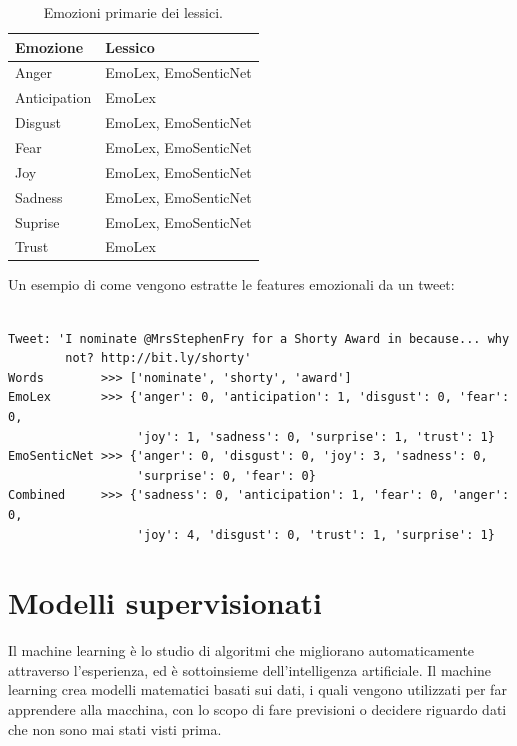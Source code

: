 \documentclass[oneside]{book}
\begin{document}
\begin{table}[h!]
	\centering
	\begin{tabular}[t]{l|l}
		\hline
		\textbf{Emozione} & \textbf{Lessico} \\
		\hline
		Anger			& EmoLex, EmoSenticNet \\
		Anticipation	& EmoLex \\
		Disgust			& EmoLex, EmoSenticNet \\
		Fear			& EmoLex, EmoSenticNet \\
		Joy				& EmoLex, EmoSenticNet \\
		Sadness			& EmoLex, EmoSenticNet \\
		Suprise			& EmoLex, EmoSenticNet \\
		Trust			& EmoLex \\
		\hline
	\end{tabular}
	\caption{Emozioni primarie dei lessici.}
\end{table}


Un esempio di come vengono estratte le features emozionali da un tweet:

\begin{lstlisting}[caption={Esempio di estrazione delle emozioni da un tweet.}]

Tweet: 'I nominate @MrsStephenFry for a Shorty Award in because... why
        not? http://bit.ly/shorty'
Words	     >>> ['nominate', 'shorty', 'award']
EmoLex       >>> {'anger': 0, 'anticipation': 1, 'disgust': 0, 'fear': 0,
                  'joy': 1, 'sadness': 0, 'surprise': 1, 'trust': 1}
EmoSenticNet >>> {'anger': 0, 'disgust': 0, 'joy': 3, 'sadness': 0,
                  'surprise': 0, 'fear': 0}
Combined     >>> {'sadness': 0, 'anticipation': 1, 'fear': 0, 'anger': 0,
                  'joy': 4, 'disgust': 0, 'trust': 1, 'surprise': 1}
\end{lstlisting}

\chapter{Modelli supervisionati}
\label{chap:supervised-models}

Il machine learning è lo studio di algoritmi che migliorano automaticamente attraverso l'esperienza, ed è sottoinsieme dell'intelligenza artificiale. Il machine learning crea modelli matematici basati sui dati, i quali vengono utilizzati per far apprendere alla macchina, con lo scopo di fare previsioni o decidere riguardo dati che non sono mai stati visti prima.
\end{document}
